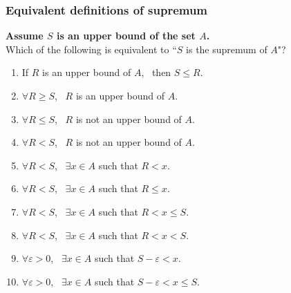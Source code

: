 \documentclass[14pt]{beamer}
\begin{document}
\begin{frame}[t]
	\fontsize{13}{13}\selectfont
	\frametitle{Equivalent definitions of supremum}

	{\bfseries Assume $S$ is an upper bound of the set $A$.} \\ Which of the following
	is equivalent to ``$S$ is the supremum of $A$"?
	\vspace{.2cm}
	\begin{enumerate}
		\item If $R$ is an upper bound of $A$, \, then $S \leq R$.
			\vspace{.2cm}

		\item $\displaystyle \forall R \geq S$, \, $R$ is an upper bound of $A$.

		\item $\displaystyle \forall R \leq S$, \, $R$ is not an upper bound of $A$.

		\item $\displaystyle \forall R < S$, \, $R$ is not an upper bound of $A$.
			\vspace{.2cm}

		\item $\displaystyle \forall R < S$, \, $\displaystyle \exists x \in A$ \;
			such that \; $\displaystyle R < x$.

		\item $\displaystyle \forall R < S$, \, $\displaystyle \exists x \in A$ \;
			such that \; $\displaystyle R \leq x$.

		\item $\displaystyle \forall R < S$, \, $\displaystyle \exists x \in A$ \;
			such that \; $\displaystyle R < x \leq S$.

		\item $\displaystyle \forall R < S$, \, $\displaystyle \exists x \in A$ \;
			such that \; $\displaystyle R < x < S$.
			\vspace{.2cm}

		\item $\displaystyle \forall \varepsilon>0$, \; \,
			$\displaystyle \exists x \in A$ \; such that \;
			$\displaystyle S - \varepsilon < x$.

		\item $\displaystyle \forall \varepsilon>0$, \; \,
			$\displaystyle \exists x \in A$ \; such that \;
			$\displaystyle S - \varepsilon < x \leq S$.
	\end{enumerate}
\end{frame}
\end{document}
